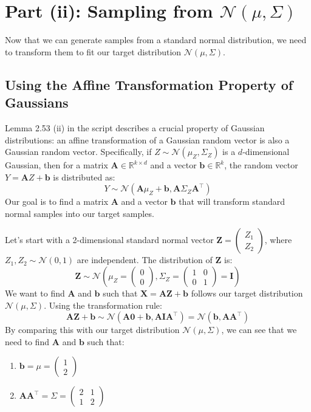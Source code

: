 \documentclass[11pt,a4paper]{article}
\newcommand{\R}{\mathbb{R}}
\newcommand{\N}{\mathcal{N}}
\newcommand{\mat}[1]{\mathbf{#1}}
\newcommand{\T}{\top}
\begin{document}
\section{Part (ii): Sampling from \texorpdfstring{$\mathcal{N}(\mu, \Sigma)$}{N(mu, Sigma)}}

Now that we can generate samples from a standard normal distribution, we need to transform them to fit our target distribution $\N(\mu, \Sigma)$.

\subsection{Using the Affine Transformation Property of Gaussians}
Lemma 2.53 (ii) in the script describes a crucial property of Gaussian distributions: an affine transformation of a Gaussian random vector is also a Gaussian random vector. Specifically, if $Z \sim \N(\mu_Z, \Sigma_Z)$ is a $d$-dimensional Gaussian, then for a matrix $\mat{A} \in \R^{k \times d}$ and a vector $\mat{b} \in \R^k$, the random vector $Y = \mat{A}Z + \mat{b}$ is distributed as:
\[ Y \sim \N(\mat{A}\mu_Z + \mat{b}, \mat{A}\Sigma_Z \mat{A}^\T) \]
Our goal is to find a matrix $\mat{A}$ and a vector $\mat{b}$ that will transform standard normal samples into our target samples.

Let's start with a 2-dimensional standard normal vector $\mat{Z} = \begin{pmatrix} Z_1 \\ Z_2 \end{pmatrix}$, where $Z_1, Z_2 \sim \N(0,1)$ are independent. The distribution of $\mat{Z}$ is:
\[ \mat{Z} \sim \N\left(\mu_Z = \begin{pmatrix} 0 \\ 0 \end{pmatrix}, \Sigma_Z = \begin{pmatrix} 1 & 0 \\ 0 & 1 \end{pmatrix} = \mat{I}\right) \]
We want to find $\mat{A}$ and $\mat{b}$ such that $\mat{X} = \mat{A}\mat{Z} + \mat{b}$ follows our target distribution $\N(\mu, \Sigma)$. Using the transformation rule:
\[ \mat{A}\mat{Z} + \mat{b} \sim \N(\mat{A}\mathbf{0} + \mat{b}, \mat{A}\mat{I}\mat{A}^\T) = \N(\mat{b}, \mat{A}\mat{A}^\T) \]
By comparing this with our target distribution $\N(\mu, \Sigma)$, we can see that we need to find $\mat{A}$ and $\mat{b}$ such that:
\begin{enumerate}
    \item $\mat{b} = \mu = \begin{pmatrix} 1 \\ 2 \end{pmatrix}$
    \item $\mat{A}\mat{A}^\T = \Sigma = \begin{pmatrix} 2 & 1 \\ 1 & 2 \end{pmatrix}$
\end{enumerate}
\end{document}
